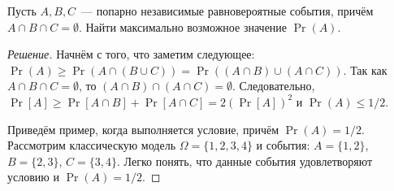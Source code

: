 \begin{problem}
    Пусть \(A, B, C\)~--- попарно независимые равновероятные события, причём \(A \cap B \cap C = \emptyset\). Найти максимально возможное значение \(\Pr(A)\).
\end{problem}
\begin{proof}[Решение]
    Начнём с того, что заметим следующее: \(\Pr(A) \geq \Pr(A \cap (B \cup C)) = \Pr((A \cap B) \cup (A \cap C))\). Так как \(A \cap B \cap C = \emptyset\), то \((A \cap B) \cap (A \cap C) = \emptyset\). Следовательно, \(\Pr[A] \geq \Pr[A \cap B] + \Pr[A \cap C] = 2(\Pr[A])^2\) и \(\Pr(A) \leq 1/2\).
    
    Приведём пример, когда выполняется условие, причём \(\Pr(A) = 1/2\). Рассмотрим классическую модель \(\Omega = \{1, 2, 3, 4\}\) и события: \(A = \{1, 2\}\), \(B = \{2, 3\}\), \(C = \{3, 4\}\). Легко понять, что данные события удовлетворяют условию и \(\Pr(A) = 1/2\).
\end{proof}

